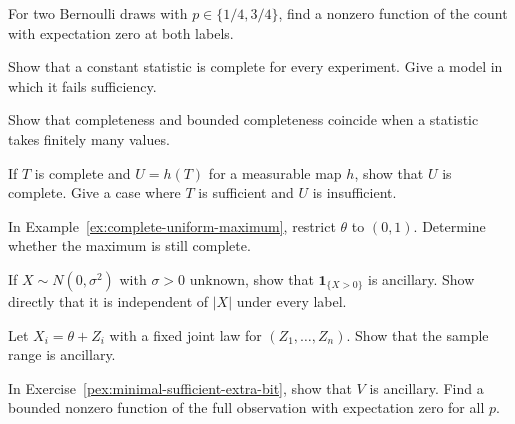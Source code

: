 \documentclass[11pt,oneside]{book}
\theoremstyle{definition}
\theoremstyle{remark}
\begin{document}
\begin{practiceexercise}
\label{pex:complete-two-parameter-counterexample}
For two Bernoulli draws with $p\in\{1/4,3/4\}$, find a nonzero
function of the count with expectation zero at both labels.
\end{practiceexercise}

\begin{practiceexercise}
\label{pex:complete-constant}
Show that a constant statistic is complete for every experiment.
Give a model in which it fails sufficiency.
\end{practiceexercise}

\begin{practiceexercise}
\label{pex:complete-finite-range}
Show that completeness and bounded completeness coincide when
a statistic takes finitely many values.
\end{practiceexercise}

\begin{practiceexercise}
\label{pex:complete-measurable-function}
If $T$ is complete and $U=h(T)$ for a measurable map $h$,
show that $U$ is complete. Give a case where $T$ is sufficient
and $U$ is insufficient.
\end{practiceexercise}

\begin{practiceexercise}
\label{pex:complete-uniform-bounded-parameter}
In Example~\ref{ex:complete-uniform-maximum}, restrict $\theta$ to
$(0,1)$. Determine whether the maximum is still complete.
\end{practiceexercise}

\begin{practiceexercise}
\label{pex:ancillary-normal-sign}
If $X\sim N(0,\sigma^2)$ with $\sigma>0$ unknown, show that
$\mathbf 1_{\{X>0\}}$ is ancillary. Show directly that it is
independent of $|X|$ under every label.
\end{practiceexercise}

\begin{practiceexercise}
\label{pex:ancillary-location-range}
Let $X_i=\theta+Z_i$ with a fixed joint law for $(Z_1,\ldots,Z_n)$.
Show that the sample range is ancillary.
\end{practiceexercise}

\begin{practiceexercise}
\label{pex:ancillary-fair-randomization}
In Exercise~\ref{pex:minimal-sufficient-extra-bit},
show that $V$ is ancillary. Find a bounded nonzero function of
the full observation with expectation zero for all $p$.
\end{practiceexercise}
\end{document}
